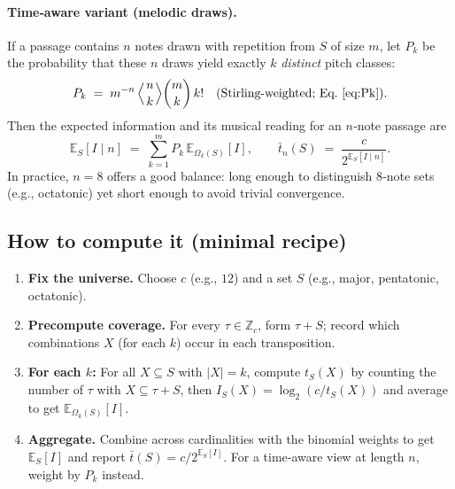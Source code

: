 \documentclass[10pt,twocolumn]{article}
\numberwithin{equation}{section} %
\begin{document}
    \paragraph{Time‑aware variant (melodic draws).}
    If a passage contains $n$ notes drawn with repetition from $S$ of size $m$, let $P_k$ be the probability that these $n$ draws yield exactly $k$ \emph{distinct} pitch classes:
    \[
        P_k \;=\; m^{-n}\, \Bigl\langle \genfrac{}{}{0pt}{}{n}{k} \Bigr\rangle \binom{m}{k}\, k!
        \quad\text{(Stirling‑weighted; Eq.~\ref{eq:Pk}).}
    \]
    Then the expected information and its musical reading for an $n$‑note passage are
    \[
        \mathbb{E}_S[I \mid n]
        \;=\; \sum_{k=1}^{m} P_k \, \mathbb{E}_{\Omega_k(S)}[I],
        \qquad
        \bar{t}_n(S) \;=\; \frac{c}{2^{\mathbb{E}_S[I \mid n]}}.
    \]
    In practice, $n{=}8$ offers a good balance: long enough to distinguish 8‑note sets (e.g., octatonic) yet short enough to avoid trivial convergence.

    \subsection*{How to compute it (minimal recipe)}
    \begin{enumerate}
        \item \textbf{Fix the universe.} Choose $c$ (e.g., $12$) and a set $S$ (e.g., major, pentatonic, octatonic).
        \item \textbf{Precompute coverage.} For every $\tau\in \mathbb{Z}_c$, form $\tau{+}S$; record which combinations $X$ (for each $k$) occur in each transposition.
        \item \textbf{For each $k$:} For all $X{\subseteq}S$ with $|X|{=}k$, compute $t_S(X)$ by counting the number of $\tau$ with $X\subseteq \tau{+}S$, then $I_S(X)=\log_2(c/t_S(X))$ and average to get $\mathbb{E}_{\Omega_k(S)}[I]$.
        \item \textbf{Aggregate.} Combine across cardinalities with the binomial weights to get $\mathbb{E}_S[I]$ and report $\bar{t}(S)=c/2^{\mathbb{E}_S[I]}$. For a time‑aware view at length $n$, weight by $P_k$ instead.
    \end{enumerate}
\end{document}
